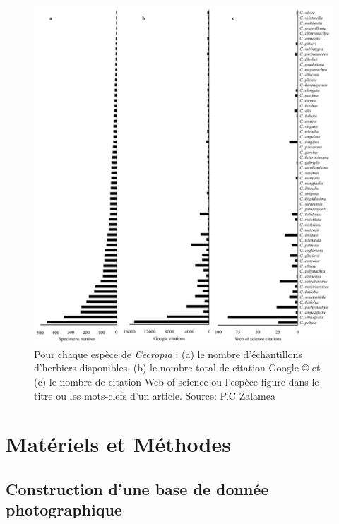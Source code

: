 \documentclass[a4paper]{article}
\theoremstyle{definition}
\theoremstyle{definition}
\theoremstyle{definition}
\theoremstyle{remark}
\begin{document}
\begin{figure}[H]

{\centering \includegraphics[width=1\linewidth]{figure/fig3} 

}

\caption{Pour chaque espèce de \emph{Cecropia} : (a) le nombre
d'échantillons d'herbiers disponibles, (b) le nombre total de citation
Google © et (c) le nombre de citation Web of science ou l'espèce figure
dans le titre ou les mots-clefs d'un article. Source: P.C Zalamea
\citeyearpar{Zalamea2009}}\label{fig:fig3}
\end{figure}

\pagebreak

\section{Matériels et Méthodes}\label{materiels-et-methodes}

\subsection{Construction d'une base de donnée
photographique}\label{construction-dune-base-de-donnee-photographique}
\end{document}
